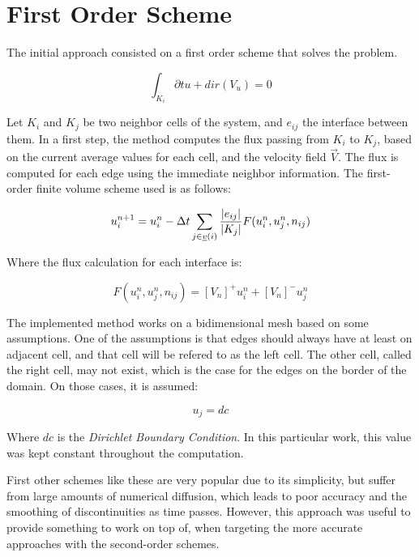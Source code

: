 \section{First Order Scheme}
\label{sec:200}

The initial approach consisted on a first order scheme that solves the problem.

$$ \int_{K_i} \partial{t} u + dir(V_u) = 0 $$

Let $K_i$ and $K_j$ be two neighbor cells of the system, and $e_{ij}$ the interface between them. In a first step, the method computes the flux passing from $K_i$ to $K_j$, based on the current average values for each cell, and the velocity field $\vec{V}$. The flux is computed for each edge using the immediate neighbor information. The first-order finite volume scheme used is as follows:

$$ u_i^{n+1} = u_i^n - \Delta{t} \sum_{j \in \underline{v}(i)} {|e_{ij}| \over |K_j|} F(u_i^n, u_j^n, n_{ij}) $$

Where the flux calculation for each interface is:

$$ F(u_i^n, u_j^n, n_{ij}) = [V_{n}]^{+}u_i^n + [V_{n}]^{-}u_j^n $$

The implemented method works on a bidimensional mesh based on some assumptions. One of the assumptions is that edges should always have at least on adjacent cell, and that cell will be refered to as the left cell. The other cell, called the right cell, may not exist, which is the case for the edges on the border of the domain. On those cases, it is assumed:

$$ u_j = dc $$

Where $dc$ is the \textit{Dirichlet Boundary Condition}. In this particular work, this value was kept constant throughout the computation.

First other schemes like these are very popular due to its simplicity, but suffer from large amounts of numerical diffusion, which leads to poor accuracy and the smoothing of discontinuities as time passes. However, this approach was useful to provide something to work on top of, when targeting the more accurate approaches with the second-order schemes.